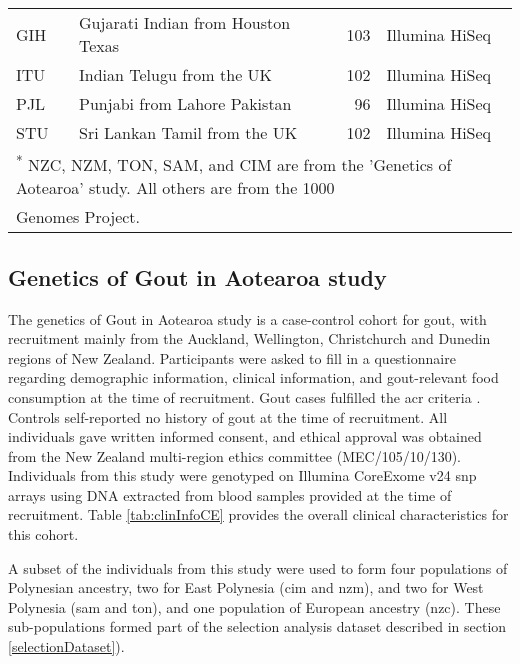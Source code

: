 \documentclass[]{report}
\begin{document}
\begin{table}
\begin{tabular}[t]{llrl}
\hspace{1em}GIH & Gujarati Indian from Houston Texas & 103 & Illumina HiSeq\\
\hspace{1em}ITU & Indian Telugu from the UK & 102 & Illumina HiSeq\\
\hspace{1em}PJL & Punjabi from Lahore Pakistan & 96 & Illumina HiSeq\\
\hspace{1em}STU & Sri Lankan Tamil from the UK & 102 & Illumina HiSeq\\
\bottomrule
\multicolumn{4}{l}{\textsuperscript{*} NZC, NZM, TON, SAM, and CIM are from the 'Genetics of Aotearoa' study. All others are from the 1000}\\
\multicolumn{4}{l}{Genomes Project.}\\
\end{tabular}
\end{table}

\subsection{Genetics of Gout in Aotearoa
study}\label{genetics-of-gout-in-aotearoa-study}

The genetics of Gout in Aotearoa study is a case-control cohort for
gout, with recruitment mainly from the Auckland, Wellington,
Christchurch and Dunedin regions of New Zealand. Participants were asked
to fill in a questionnaire regarding demographic information, clinical
information, and gout-relevant food consumption at the time of
recruitment. Gout cases fulfilled the \gls{acr} criteria
\citep{Wallace1977a}. Controls self-reported no history of gout at the
time of recruitment. All individuals gave written informed consent, and
ethical approval was obtained from the New Zealand multi-region ethics
committee (MEC/105/10/130). Individuals from this study were genotyped
on Illumina CoreExome v24 \gls{snp} arrays using DNA extracted from
blood samples provided at the time of recruitment. Table
\ref{tab:clinInfoCE} provides the overall clinical characteristics for
this cohort.

A subset of the individuals from this study were used to form four
populations of Polynesian ancestry, two for East Polynesia (\gls{cim}
and \gls{nzm}), and two for West Polynesia (\gls{sam} and \gls{ton}),
and one population of European ancestry (\gls{nzc}). These
sub-populations formed part of the selection analysis dataset described
in section \ref{selectionDataset}).
\end{document}
